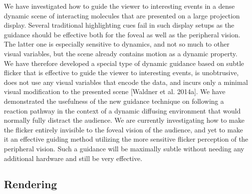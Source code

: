 We have investigated how to guide the viewer to interesting events in a dense dynamic scene of interacting molecules that are presented on a large projection display. 
Several traditional highlighting cues fail in such display setups as the guidance should be effective both for the foveal as well as the peripheral vision. 
The latter one is especially sensitive to dynamics, and not so much to other visual variables, but the scene already contains motion as a dynamic property. 
We have therefore developed a special type of dynamic guidance based on subtle flicker that is effective to guide the viewer to interesting events, is unobtrusive, does not use any visual variables that encode the data, and incurs only a minimal visual modification to the presented scene [Waldner et al. 2014a].
We have demonstrated the usefulness of the new guidance technique on following a reaction pathway in the context of a dynamic diffusing environment that would normally fully distract the audience.  
We are currently investigating how to make the flicker entirely invisible to the foveal vision of the audience, and yet to make it an effective guiding method utilizing the more sensitive flicker perception of the peripheral vision. Such a guidance will be maximally subtle without needing any additional hardware and still be very effective.

\subsection{Rendering}

